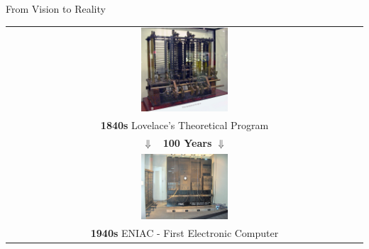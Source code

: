 \documentclass{beamer}
\begin{document}
\begin{frame}[t]{From Vision to Reality}
\begin{center}
    \begin{tabular}{c}
        \includegraphics[width=0.25\textwidth]{images/AnalyticalMachine_Babbage_London.jpg} \\
        \textbf{1840s} Lovelace's Theoretical Program \\
        $\Downarrow$ \textbf{~100 Years} $\Downarrow$ \\
        \includegraphics[width=0.25\textwidth]{images/ENIAC_Penn1.jpg} \\
        \textbf{1940s} ENIAC - First Electronic Computer \\
    \end{tabular}
\end{center}
\end{frame}
\end{document}

